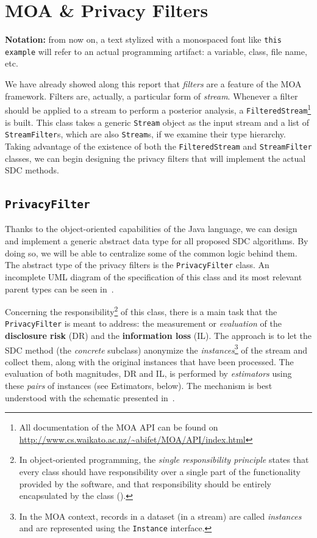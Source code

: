 \section{MOA \& Privacy Filters}
\label{Implementation:PrivacyFilter}

\textbf{Notation:} from now on, a text stylized with a monospaced font like \texttt{this example} will refer to an actual programming artifact: a variable, class, file name, etc.

We have already showed along this report that \textit{filters} are a feature of the MOA framework. Filters are, actually, a particular form of \textit{stream}. Whenever a filter should be applied to a stream to perform a posterior analysis, a \texttt{FilteredStream}\footnote{All documentation of the MOA API can be found on \url{http://www.cs.waikato.ac.nz/~abifet/MOA/API/index.html}} is built. This class takes a generic \texttt{Stream} object as the input stream and a list of \texttt{StreamFilter}s, which are also \texttt{Stream}s, if we examine their type hierarchy. Taking advantage of the existence of both the \texttt{FilteredStream} and \texttt{StreamFilter} classes, we can begin designing the privacy filters that will implement the actual SDC methods.

\subsection{\texttt{PrivacyFilter}}
\label{Implementation:PrivacyFilter:PrivacyFilter}

Thanks to the object-oriented capabilities of the Java language, we can design and implement a generic abstract data type for all proposed SDC algorithms. By doing so, we will be able to centralize some of the common logic behind them. The abstract type of the privacy filters is the \texttt{PrivacyFilter} class. An incomplete UML diagram of the specification of this class and its most relevant parent types can be seen in~.

Concerning the responsibility\footnote{In object-oriented programming, the \textit{single responsibility principle} states that every class should have responsibility over a single part of the functionality provided by the software, and that responsibility should be entirely encapsulated by the class (\citet{web:SOLID}).} of this class, there is a main task that the \texttt{PrivacyFilter} is meant to address: the measurement or \textit{evaluation} of the \textbf{disclosure risk} (DR) and the \textbf{information loss} (IL). The approach is to let the SDC method (the \textit{concrete} subclass) anonymize the \textit{instances}\footnote{In the MOA context, records in a dataset (in a stream) are called \textit{instances} and are represented using the \texttt{Instance} interface.} of the stream and collect them, along with the original instances that have been processed. The evaluation of both magnitudes, DR and IL, is performed by \textit{estimators} using these \textit{pairs} of instances (see Estimators, below). The mechanism is best understood with the schematic presented in~.

